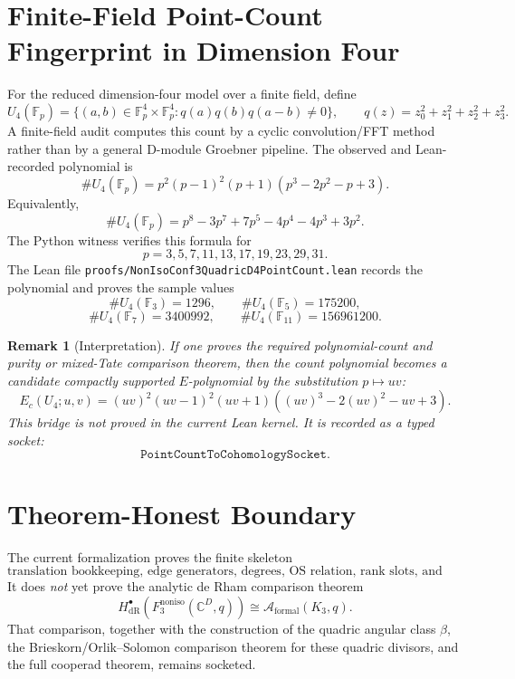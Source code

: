 \documentclass[11pt]{article}
\newtheorem{remark}[theorem]{Remark}
\newcommand{\dR}{\operatorname{dR}}
\begin{document}
\section{Finite-Field Point-Count Fingerprint in Dimension Four}
For the reduced dimension-four model over a finite field, define
\[
U_4(\mathbb F_p)=
\{(a,b)\in \mathbb F_p^4\times \mathbb F_p^4:
q(a)q(b)q(a-b)\neq 0\},
\qquad
q(z)=z_0^2+z_1^2+z_2^2+z_3^2.
\]
A finite-field audit computes this count by a cyclic convolution/FFT method rather than by a general D-module Groebner pipeline.  The observed and Lean-recorded polynomial is
\[
\#U_4(\mathbb F_p)
=
p^2(p-1)^2(p+1)(p^3-2p^2-p+3).
\]
Equivalently,
\[
\#U_4(\mathbb F_p)
=
p^8-3p^7+7p^5-4p^4-4p^3+3p^2.
\]
The Python witness verifies this formula for
\[
p=3,5,7,11,13,17,19,23,29,31.
\]
The Lean file \texttt{proofs/NonIsoConf3QuadricD4PointCount.lean} records the polynomial and proves the sample values
\[
\#U_4(\mathbb F_3)=1296,
\qquad
\#U_4(\mathbb F_5)=175200,
\]
\[
\#U_4(\mathbb F_7)=3400992,
\qquad
\#U_4(\mathbb F_{11})=156961200.
\]

\begin{remark}[Interpretation]
If one proves the required polynomial-count and purity or mixed-Tate comparison theorem, then the count polynomial becomes a candidate compactly supported $E$-polynomial by the substitution $p\mapsto uv$:
\[
E_c(U_4;u,v)
=(uv)^2(uv-1)^2(uv+1)((uv)^3-2(uv)^2-uv+3).
\]
This bridge is not proved in the current Lean kernel.  It is recorded as a typed socket:
\[
\texttt{PointCountToCohomologySocket}.
\]
\end{remark}

\section{Theorem-Honest Boundary}
The current formalization proves the finite skeleton
\[
\boxed{
\text{translation bookkeeping, edge generators, degrees, OS relation, rank slots, and cooperad edge maps.}
}
\]
It does \emph{not} yet prove the analytic de Rham comparison theorem
\[
H^\bullet_{\dR}\!
\left(F_3^{\mathrm{noniso}}(\mathbb C^D,q)\right)
\cong
\mathcal A_{\mathrm{formal}}(K_3,q).
\]
That comparison, together with the construction of the quadric angular class $\beta$, the Brieskorn/Orlik--Solomon comparison theorem for these quadric divisors, and the full cooperad theorem, remains socketed.
\end{document}
